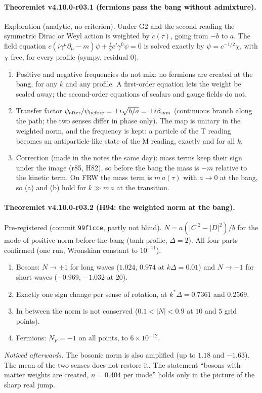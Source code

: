 \paragraph{Theoremlet v4.10.0-r03.1 (fermions pass the bang without admixture).}
Exploration (analytic, no criterion).  Under G2 and the second reading the symmetric Dirac or Weyl action is weighted by \(c(\tau)\), going from
\(-b\) to \(a\).  The field equation \(c(i\gamma^\mu\partial_\mu-m)\psi+\tfrac i2c'\gamma^0\psi=0\) is solved exactly by \(\psi=c^{-1/2}\chi\), with \(\chi\) free, for
every profile (sympy, residual \(0\)).
\begin{enumerate}[leftmargin=2em]
\item[(a)] Positive and negative frequencies do not mix: no fermions are created at the bang, for any \(k\) and any profile.  A first-order equation lets
the weight be scaled away; the second-order equations of scalars and gauge fields do not.
\item[(b)] Transfer factor \(\psi_{\rm after}/\psi_{\rm before}=\pm i\sqrt{b/a}=\pm i\beta_{\rm sym}\) (continuous branch along the path; the two senses differ in phase
only).  The map is unitary in the weighted norm, and the frequency is kept: a particle of the T reading becomes an antiparticle-like state of the M
reading, exactly and for all \(k\).
\item[(c)] Correction (made in the notes the same day): mass terms keep their sign under the image (r85, H82), so before the bang the mass is \(-m\)
relative to the kinetic term.  On FRW the mass term is \(m\,a(\tau)\) with \(a\to0\) at the bang, so (a) and (b) hold for \(k\gg m\,a\) at the transition.
\end{enumerate}

\paragraph{Theoremlet v4.10.0-r03.2 (H94: the weighted norm at the bang).}
Pre-registered (commit \texttt{99f1cce}, partly not blind).  \(N=a(|C|^2-|D|^2)/b\) for the mode of positive norm before the bang (tanh profile,
\(\Delta=2\)).  All four parts confirmed (one run, Wronskian constant to \(10^{-11}\)).
\begin{enumerate}[leftmargin=2em]
\item[(a)] Bosons: \(N\to+1\) for long waves (\(1.024\), \(0.974\) at \(k\Delta=0.01\)) and \(N\to-1\) for short waves (\(-0.969\), \(-1.032\) at \(20\)).
\item[(b)] Exactly one sign change per sense of rotation, at \(k^*\Delta=0.7361\) and \(0.2569\).
\item[(c)] In between the norm is not conserved (\(0.1<|N|<0.9\) at \(10\) and \(5\) grid points).
\item[(d)] Fermions: \(N_F=-1\) on all points, to \(6\times10^{-12}\).
\end{enumerate}
\emph{Noticed afterwards.}  The bosonic norm is also amplified (up to \(1.18\) and \(-1.63\)).  The mean of the two senses does not restore it.  The
statement ``bosons with matter weights are created, \(n=0.404\) per mode'' holds only in the picture of the sharp real jump.

